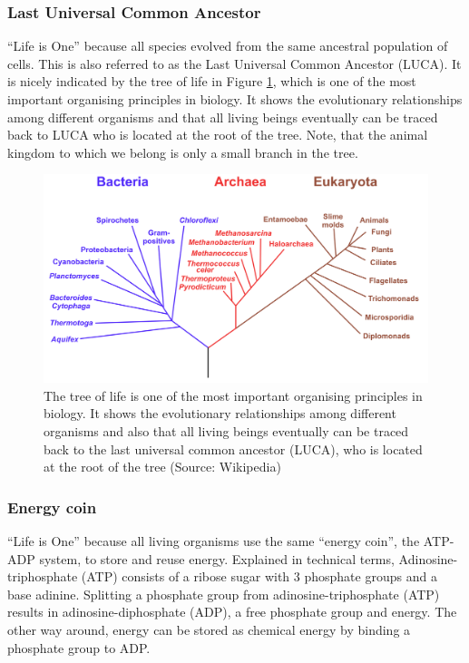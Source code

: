 \documentclass[
  11pt,
]{book}
\begin{document}
\hypertarget{last-universal-common-ancestor}{%
\subsubsection{Last Universal Common Ancestor}\label{last-universal-common-ancestor}}

``Life is One'' because all species evolved from the same ancestral population of cells.
This is also referred to as the Last Universal Common Ancestor (LUCA). It is nicely indicated by the tree of life in Figure \ref{fig:treeOfLife}, which is one of the most important organising principles in biology. It shows the evolutionary relationships among different organisms and that all living beings eventually can be traced back to LUCA who is located at the root of the tree. Note, that the animal kingdom to which we belong is only a small branch in the tree.

\begin{figure}

{\centering \includegraphics[width=0.8\linewidth]{./figs/Phylogenetic_tree} 

}

\caption{The tree of life is one of the most important organising principles in biology. It shows the evolutionary relationships among different organisms and also that all living beings eventually can be traced back to the last universal common ancestor (LUCA), who is located at the root of the tree (Source: Wikipedia)}\label{fig:treeOfLife}
\end{figure}

\newpage

\hypertarget{sectionEnergyCoin}{%
\subsubsection{Energy coin}\label{sectionEnergyCoin}}

``Life is One'' because all living organisms use the same ``energy coin'', the ATP-ADP system, to store and reuse energy.
Explained in technical terms, Adinosine-triphosphate (ATP) consists of a ribose sugar with 3 phosphate groups and a base adinine.
Splitting a phosphate group from adinosine-triphosphate (ATP) results in adinosine-diphosphate (ADP), a free phosphate group and energy.
The other way around, energy can be stored as chemical energy by binding a phosphate group to ADP.
\end{document}
